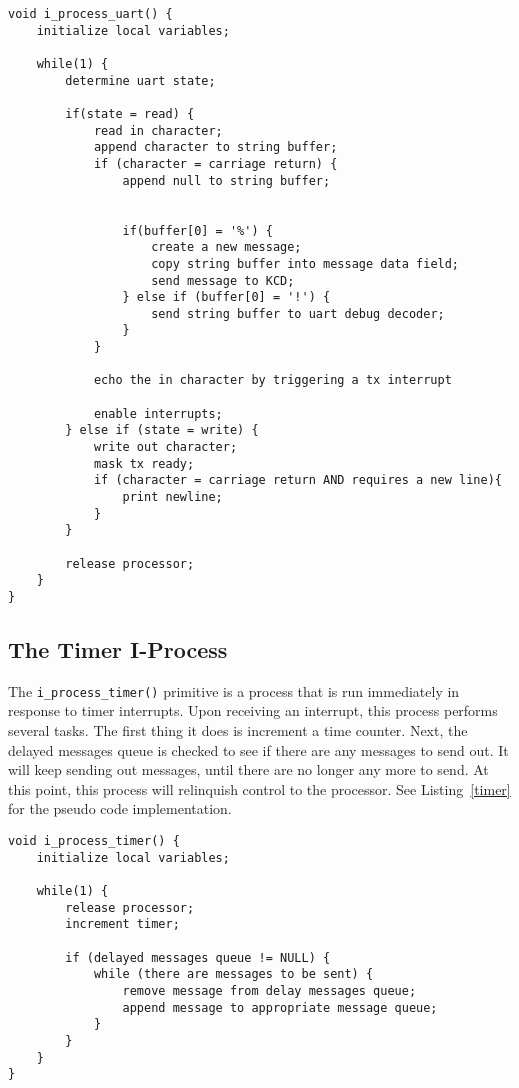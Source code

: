 \documentclass[oneside]{article}
\begin{document}
\begin{lstlisting}
void i_process_uart() {
    initialize local variables;

    while(1) {
        determine uart state;

        if(state = read) {
            read in character;
            append character to string buffer;
            if (character = carriage return) {
                append null to string buffer;
                

                if(buffer[0] = '%') {
                    create a new message;
                    copy string buffer into message data field;
                    send message to KCD;                
                } else if (buffer[0] = '!') {
                    send string buffer to uart debug decoder;
                } 
            }

            echo the in character by triggering a tx interrupt

            enable interrupts;
        } else if (state = write) {
            write out character;
            mask tx ready;
            if (character = carriage return AND requires a new line){
                print newline;
            }
        }
    
        release processor;
    }
}
\end{lstlisting}

\subsection*{The Timer I-Process}

The \texttt{i\_process\_timer()} primitive is a process that is run immediately
in response to timer interrupts.  Upon receiving an interrupt, this process
performs several tasks. The first thing it does is increment a time counter.
Next, the delayed messages queue is checked to see if there are any messages to
send out. It will keep sending out messages, until there are no longer any more
to send. At this point, this process will relinquish control to the processor.
See Listing~\ref{timer} for the pseudo code implementation.

\begin{lstlisting}
void i_process_timer() {
    initialize local variables;

    while(1) {
        release processor;
        increment timer;

        if (delayed messages queue != NULL) {
            while (there are messages to be sent) {
                remove message from delay messages queue;
                append message to appropriate message queue;
            }
        }
    }
}
\end{lstlisting}
\end{document}
